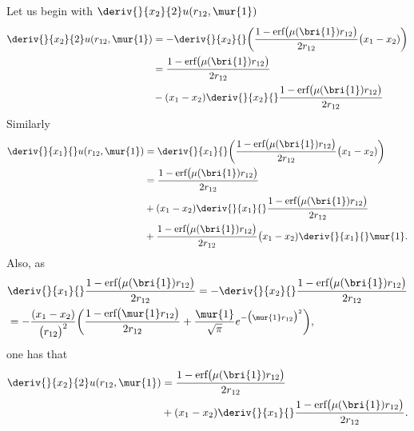 


Let us begin with $\deriv{}{x_2}{2}u(r_{12},\mur{1})$
\begin{equation}
 \begin{aligned}
  \deriv{}{x_2}{2}u(r_{12},\mur{1}) & = - \deriv{}{x_2}{} \bigg( \frac{1 - \text{erf}\big(\mu(\bri{1}) r_{12} \big)}{2 r_{12}}\big( x_1 - x_2) \bigg) \\
                                    & =  \frac{1 - \text{erf}\big(\mu(\bri{1}) r_{12} \big)}{2 r_{12}} \\ & - (x_1 - x_2) \deriv{}{x_2}{} \frac{1 - \text{erf}\big(\mu(\bri{1}) r_{12} \big)}{2 r_{12}}
 \end{aligned}
\end{equation}
Similarly 
\begin{equation}
 \begin{aligned}
  \deriv{}{x_1}{}u(r_{12},\mur{1}) & = \deriv{}{x_1}{}\bigg( \frac{1 - \text{erf}\big(\mu(\bri{1}) r_{12} \big)}{2 r_{12}}\big( x_1 - x_2) \bigg) \\
                                   & = \frac{1 - \text{erf}\big(\mu(\bri{1}) r_{12} \big)}{2 r_{12}} \\ 
                                   & + (x_1 - x_2) \deriv{}{x_1}{} \frac{1 - \text{erf}\big(\mu(\bri{1}) r_{12} \big)}{2 r_{12}} \\ 
                                   & + \frac{1 - \text{erf}\big(\mu(\bri{1}) r_{12} \big)}{2 r_{12}}\big( x_1 - x_2) \deriv{}{x_1}{} \mur{1}. 
 \end{aligned}
\end{equation}
Also, as 
\begin{equation}
 \label{eq:der_erfc_r12}
 \begin{aligned}
 &\deriv{}{x_1}{} \frac{1 - \text{erf}\big(\mu(\bri{1}) r_{12} \big)}{2 r_{12}}  = - \deriv{}{x_2}{} \frac{1 - \text{erf}\big(\mu(\bri{1}) r_{12} \big)}{2 r_{12}} \\
 & =  -\frac{(x_1 - x_2)}{\big( r_{12} \big)^2}\bigg(\frac{1 - \text{erf}\big( \mur{1} r_{12} \big)}{2 r_{12}}  + \frac{\mur{1}}{\sqrt{\pi}} e^{-\big(\mur{1} r_{12} \big)^2}      \bigg), 
 \end{aligned}
\end{equation}
one has that 
\begin{equation}
 \begin{aligned}
  \deriv{}{x_2}{2}u(r_{12},\mur{1}) & = \frac{1 - \text{erf}\big(\mu(\bri{1}) r_{12} \big)}{2 r_{12}} \\
                                    & + (x_1 - x_2) \deriv{}{x_1}{} \frac{1 - \text{erf}\big(\mu(\bri{1}) r_{12} \big)}{2 r_{12}}. 
 \end{aligned}
\end{equation}
